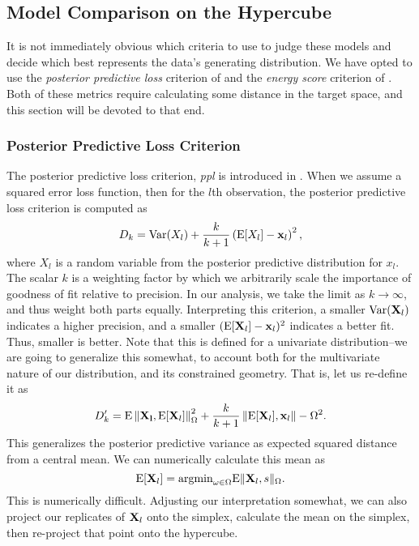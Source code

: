 \subsection{Model Comparison on the Hypercube}
It is not immediately obvious which criteria to use to judge these models and decide which best
  represents the data's generating distribution.  We have opted to use the
  \emph{posterior predictive loss} criterion of \cite{gelfand1998} and the
  \emph{energy score} criterion of \cite{gneiting2007}.  Both of these
  metrics require calculating some distance in the target space, and this section will be devoted
  to that end.

\subsubsection{Posterior Predictive Loss Criterion}
The posterior predictive loss criterion, \emph{ppl} is introduced in \cite{gelfand1998}.  When we assume a
  squared error loss function, then for the $l$th observation, the posterior predictive loss criterion
  is computed as
  \begin{equation}
    \label{eq:ppl}
    D_k = \text{Var}(X_l) + \frac{k}{k + 1}\left(\text{E}[X_l] - {\bf x}_l\right)^2,
  \end{equation}
  where $X_l$ is a random variable from the posterior predictive distribution for $x_l$.  The
  scalar $k$ is a weighting factor by which we arbitrarily scale the importance of goodness of fit
  relative to precision.  In our analysis, we take the limit as $k\to\infty$, and thus weight both
  parts equally.  Interpreting this criterion, a smaller $\text{Var}({\bf X}_l)$ indicates a higher
  precision, and a smaller $(\text{E}[{\bf X}_l] - {\bf x}_l)^2$  indicates a better fit.  Thus,
  smaller is better.  Note that this is defined for a univariate distribution--we are going to
  generalize this somewhat, to account both for the multivariate nature of our distribution, and
  its constrained geometry.  That is, let us re-define it as
  \begin{equation}
    \label{eq:ppl2}
    D_k^{\prime} = \text{E}\left\lVert{\bf X_l},\text{E}[{\bf X}_l]\right\rVert_{\Omega}^2 +
                    \frac{k}{k+1}\left\lVert\text{E}[{\bf X}_l],{\bf x}_l\right\rVert-{\Omega}^2.
  \end{equation}
  This generalizes the posterior predictive variance as expected squared distance from a central
  mean.  We can numerically calculate this mean as 
  \begin{equation*}
    \text{E}[{\bf X}_l] = \text{argmin}_{\omega \in \Omega}\text{E}\lVert {\bf X}_l, s \rVert_{\Omega}.
  \end{equation*}
  This is numerically difficult. Adjusting our interpretation somewhat, we can also project our
  replicates of ${\bf X}_l$ onto the simplex, calculate the mean on the simplex, then re-project
  that point onto the hypercube.

